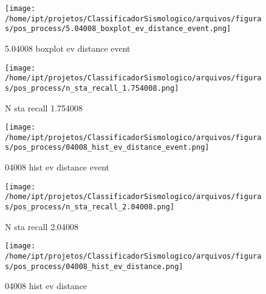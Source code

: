                     \begin{figure}[H]
                        \centering
                        \texttt{[image: /home/ipt/projetos/ClassificadorSismologico/arquivos/figuras/pos\_process/5.04008\_boxplot\_ev\_distance\_event.png]}
                        \caption{5.04008 boxplot ev distance event}
                        \label{fig:5.04008_boxplot_ev_distance_event}
                    \end{figure}
                

                    \begin{figure}[H]
                        \centering
                        \texttt{[image: /home/ipt/projetos/ClassificadorSismologico/arquivos/figuras/pos\_process/n\_sta\_recall\_1.754008.png]}
                        \caption{N sta recall 1.754008}
                        \label{fig:n_sta_recall_1.754008}
                    \end{figure}
                

                    \begin{figure}[H]
                        \centering
                        \texttt{[image: /home/ipt/projetos/ClassificadorSismologico/arquivos/figuras/pos\_process/04008\_hist\_ev\_distance\_event.png]}
                        \caption{04008 hist ev distance event}
                        \label{fig:04008_hist_ev_distance_event}
                    \end{figure}
                

                    \begin{figure}[H]
                        \centering
                        \texttt{[image: /home/ipt/projetos/ClassificadorSismologico/arquivos/figuras/pos\_process/n\_sta\_recall\_2.04008.png]}
                        \caption{N sta recall 2.04008}
                        \label{fig:n_sta_recall_2.04008}
                    \end{figure}
                

                    \begin{figure}[H]
                        \centering
                        \texttt{[image: /home/ipt/projetos/ClassificadorSismologico/arquivos/figuras/pos\_process/04008\_hist\_ev\_distance.png]}
                        \caption{04008 hist ev distance}
                        \label{fig:04008_hist_ev_distance}
                    \end{figure}
                

